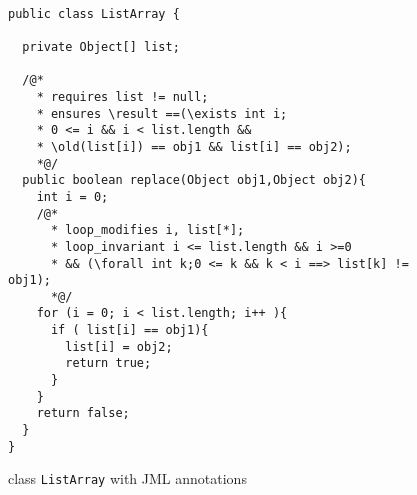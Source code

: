 \begin{figure}[ht!]
\begin{lstlisting}[frame=trbl] 

public class ListArray {

  private Object[] list;

  /@*
    * requires list != null;
    * ensures \result ==(\exists int i; 
    * 0 <= i && i < list.length && 
    * \old(list[i]) == obj1 && list[i] == obj2);
    *@/
  public boolean replace(Object obj1,Object obj2){
    int i = 0;
    /@*
      * loop_modifies i, list[*];
      * loop_invariant i <= list.length && i >=0 
      * && (\forall int k;0 <= k && k < i ==> list[k] != obj1);
      *@/
    for (i = 0; i < list.length; i++ ){
      if ( list[i] == obj1){
        list[i] = obj2;
        return true;	
      }
    }
    return false;
  }
}
\end{lstlisting}
\caption{\sc class \mbox{\rm \lstinline!ListArray!} with JML annotations} 
\label{replaceSrc}
\end{figure}



